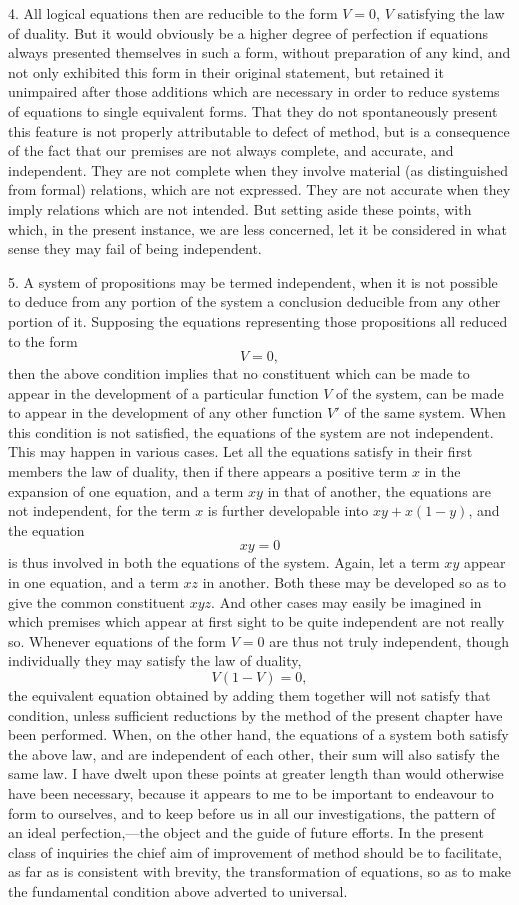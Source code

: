 \documentclass[oneside]{book}
\begin{document}
4. All logical equations then are reducible to the form $V=0$,
$V$ satisfying the law of duality. But it would obviously be a
higher degree of perfection if equations always presented themselves
in such a form, without preparation of any kind, and not
only exhibited this form in their original statement, but retained
it unimpaired after those additions which are necessary in order
to reduce systems of equations to single equivalent forms. That
they do not spontaneously present this feature is not properly
attributable to defect of method, but is a consequence of the fact
that our premises are not always complete, and accurate, and independent.
They are not complete when they involve material
(as distinguished from formal) relations, which are not expressed.
They are not accurate when they imply relations which are not
intended. But setting aside these points, with which, in the
present instance, we are less concerned, let it be considered in
what sense they may fail of being independent.

5. A system of propositions may be termed independent,
when it is not possible to deduce from any portion of the system
a conclusion deducible from any other portion of it. Supposing
the equations representing those propositions all reduced to the
form
\[
V=0,
\]
then the above condition implies that no constituent which can
be made to appear in the development of a particular function $V$
of the system, can be made to appear in the development of any
other function $V'$ of the same system. When this condition is
not satisfied, the equations of the system are not independent.
This may happen in various cases. Let all the equations satisfy
in their first members the law of duality, then if there appears a
positive term $x$ in the expansion of one equation, and a term $xy$
in that of another, the equations are not independent, for the
term $x$ is further developable into $xy + x ( 1 - y)$, and the equation
\[
xy=0
\]
is thus involved in both the equations of the system. Again, let
a term $xy$ appear in one equation, and a term $xz$ in another.
Both these may be developed so as to give the common constituent
$xyz$. And other cases may easily be imagined in which
premises which appear at first sight to be quite independent are
not really so. Whenever equations of the form $V = 0$ are thus
not truly independent, though individually they may satisfy the
law of duality,
\[
V(1 - V) = 0,
\]
the equivalent equation obtained by adding them together will
not satisfy that condition, unless sufficient reductions by the method
of the present chapter have been performed. When, on
the other hand, the equations of a system both satisfy the above
law, and are independent of each other, their sum will also satisfy
the same law. I have dwelt upon these points at greater
length than would otherwise have been necessary, because it appears
to me to be important to endeavour to form to ourselves,
and to keep before us in all our investigations, the pattern of an
ideal perfection,---the object and the guide of future efforts. In
the present class of inquiries the chief aim of improvement of method
should be to facilitate, as far as is consistent with brevity,
the transformation of equations, so as to make the fundamental
condition above adverted to universal.
\end{document}

